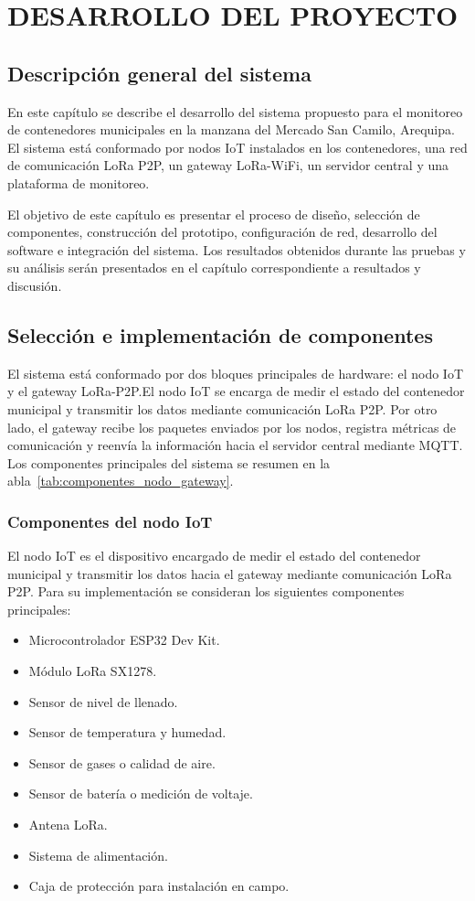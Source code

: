 \chapter{DESARROLLO DEL PROYECTO}

\section{Descripción general del sistema}

En este capítulo se describe el desarrollo del sistema propuesto para el monitoreo de contenedores municipales en la manzana del Mercado San Camilo, Arequipa. El sistema está conformado por nodos IoT instalados en los contenedores, una red de comunicación LoRa P2P, un gateway LoRa-WiFi, un servidor central y una plataforma de monitoreo.

El objetivo de este capítulo es presentar el proceso de diseño, selección de componentes, construcción del prototipo, configuración de red, desarrollo del software e integración del sistema. Los resultados obtenidos durante las pruebas y su análisis serán presentados en el capítulo correspondiente a resultados y discusión.

\section{Selección e implementación de componentes}
El sistema está conformado por dos bloques principales de hardware: el nodo IoT y el gateway LoRa-P2P.El nodo IoT se encarga de medir el estado del contenedor municipal y transmitir los datos mediante comunicación LoRa P2P. Por otro lado, el gateway recibe los paquetes enviados por los nodos, registra métricas de comunicación y reenvía la información hacia el servidor central mediante MQTT. Los componentes principales del sistema se resumen en la abla~\ref{tab:componentes_nodo_gateway}.

\subsection{Componentes del nodo IoT}

El nodo IoT es el dispositivo encargado de medir el estado del contenedor municipal y transmitir los datos hacia el gateway mediante comunicación LoRa P2P. Para su implementación se consideran los siguientes componentes principales:

\begin{itemize}
    \item Microcontrolador ESP32 Dev Kit.
    \item Módulo LoRa SX1278.
    \item Sensor de nivel de llenado.
    \item Sensor de temperatura y humedad.
    \item Sensor de gases o calidad de aire.
    \item Sensor de batería o medición de voltaje.
    \item Antena LoRa.
    \item Sistema de alimentación.
    \item Caja de protección para instalación en campo.
\end{itemize}

